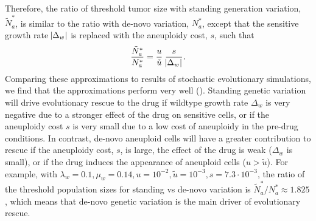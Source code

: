 \documentclass[12pt]{extarticle}
\begin{document}
Therefore, the ratio of threshold tumor size with standing generation variation, $\tilde{N}^*_{a}$, is similar to the ratio with de-novo variation, $N^*_a$, except that the sensitive growth rate $\abs{\Delta_w}$ is replaced with the aneuploidy cost, $s$, such that 
\begin{equation}\label{eq:Nsgv}
\frac{\tilde{N}^*_{a}}{N^*_{a}} = \frac{u}{\tilde{u}} \; \frac{s}{\abs{\Delta_w}}.
\end{equation}
Comparing these approximations to results of stochastic evolutionary simulations, we find that the approximations perform very well ().  %
Standing genetic variation will drive evolutionary rescue to the drug if wildtype growth rate $\Delta_w$ is very negative due to a stronger effect of the drug on sensitive cells, or if the aneuploidy cost $s$ is very small due to a low cost of aneuploidy in the pre-drug conditions.
In contrast, de-novo aneuploid cells will have a greater contribution to rescue if the aneuploidy cost, $s$, is large, the effect of the drug is weak ($\Delta_w$ is small), or if the drug induces the appearance of aneuploid cells ($u > \tilde u$).
For example, with  $\lambda_w=0.1,\mu_w=0.14, u=10^{-2}, \tilde{u}=10^{-3}, s=7.3\cdot10^{-3}$, the ratio of the threshold population sizes for standing vs de-novo variation is $\tilde{N}^*_a/N^*_a \approx 1.825$, which means that de-novo genetic variation is  the main driver of evolutionary rescue.
\end{document}
